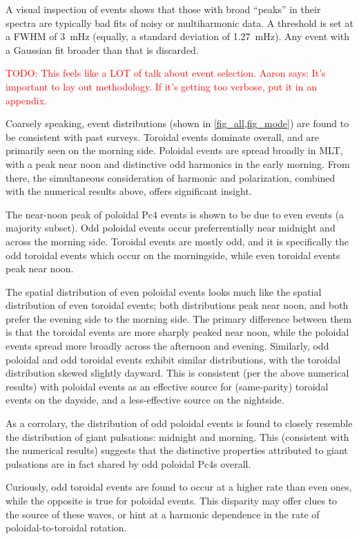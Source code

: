 \documentclass{article}
\newcommand{\todo}[1]{ \textcolor{red}{TODO: #1} }
\begin{document}
A visual inspection of events shows that those with broad ``peaks'' in their spectra are typically bad fits of noisy or multiharmonic data. A threshold is set at a FWHM of \SI{3}{\mHz} (equally, a standard deviation of \SI{1.27}{\mHz}). Any event with a Gaussian fit broader than that is discarded.

\todo{This feels like a LOT of talk about event selection. Aaron says: It's important to lay out methodology. If it's getting too verbose, put it in an appendix.}

Coarsely speaking, event distributions (shown in \cref{fig_all,fig_mode}) are found to be consistent with past surveys. Toroidal events dominate overall, and are primarily seen on the morning side. Poloidal events are spread broadly in MLT, with a peak near noon and distinctive odd harmonics in the early morning. From there, the simultaneous consideration of harmonic and polarization, combined with the numerical results above, offers significant insight.

The near-noon peak of poloidal Pc4 events is shown to be due to even events (a majority subset). Odd poloidal events occur preferrentially near midnight and across the morning side. Toroidal events are mostly odd, and it is specifically the odd toroidal events which occur on the morningside, while even toroidal events peak near noon.

The spatial distribution of even poloidal events looks much like the spatial distribution of even toroidal events; both distributions peak near noon, and both prefer the evening side to the morning side. The primary difference between them is that the toroidal events are more sharply peaked near noon, while the poloidal events spread more broadly across the afternoon and evening. Similarly, odd poloidal and odd toroidal events exhibit similar distributions, with the toroidal distribution skewed slightly dayward. This is consistent (per the above numerical results) with poloidal events as an effective source for (same-parity) toroidal events on the dayside, and a less-effective source on the nightside.

As a corrolary, the distribution of odd poloidal events is found to closely resemble the distribution of giant pulsations: midnight and morning. This (consistent with the numerical results) suggests that the distinctive properties attributed to giant pulsations are in fact shared by odd poloidal Pc4s overall.

Curiously, odd toroidal events are found to occur at a higher rate than even ones, while the opposite is true for poloidal events. This disparity may offer clues to the source of these waves, or hint at a harmonic dependence in the rate of poloidal-to-toroidal rotation.
\end{document}
